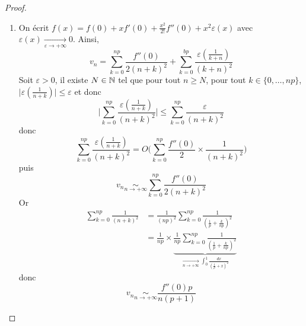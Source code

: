 \documentclass[12pt]{article}
\begin{document}
\begin{proof}
\begin{enumerate}
		\item On écrit $f(x)=f(0)+xf'(0)+\frac{x^{2}}{2!}f''(0)+x^{2}\varepsilon(x)$ avec $\varepsilon(x)\xrightarrow[\varepsilon\to+\infty]{}0$. Ainsi, 
		\begin{equation}v_{n}=\sum_{k=0}^{np}\frac{f''(0)}{2(n+k)^{2}}+\sum_{k=0}^{bp}\frac{\varepsilon(\frac{1}{k+n})}{(k+n)^{2}}\end{equation}
		Soit $\varepsilon>0$, il existe $N\in\mathbb{N}$ tel que pour tout $n\geqslant N$, pour tout $k\in\{0,\dots,np\}$, $\vert\varepsilon(\frac{1}{n+k})\vert\leqslant\varepsilon$ et donc 
		\begin{equation}\Biggl\vert\sum_{k=0}^{np}\frac{\varepsilon(\frac{1}{n+k})}{(n+k)^{2}}\Biggr\vert\leqslant\sum_{k=0}^{np}\frac{\varepsilon}{(n+k)^{2}}\end{equation}
		donc 
		\begin{equation}\sum_{k=0}^{np}\frac{\varepsilon(\frac{1}{n+k})}{(n+k)^{2}}=O\Biggl(\sum_{k=0}^{np}\frac{f''(0)}{2}\times\frac{1}{(n+k)^{2}}\Biggr)\end{equation}
		puis
		\begin{equation}v_{n}\underset{n\to+\infty}{\sim}\sum_{k=0}^{np}\frac{f''(0)}{2(n+k)^{2}}\end{equation}
		Or 
		\begin{align}
			\sum_{k=0}^{np}\frac{1}{(n+k)^{2}}
			&=\frac{1}{(np)^{2}}\sum_{k=0}^{np}\frac{1}{(\frac{1}{p}+\frac{k}{np})^{2}}\\
			&=\frac{1}{np}\times \underbrace{\frac{1}{np}\sum_{k=0}^{np}\frac{1}{(\frac{1}{p}+\frac{k}{np})^{2}}}_{\xrightarrow[n\to+\infty]{}\int_{0}^{1}\frac{dx}{(\frac{1}{p}+x)^{2}}}
		\end{align}
		donc 
		\begin{equation}v_{n}\underset{n\to+\infty}{\sim}\frac{f''(0)p}{n(p+1)}\end{equation}
	\end{enumerate}
\end{proof}
\end{document}
